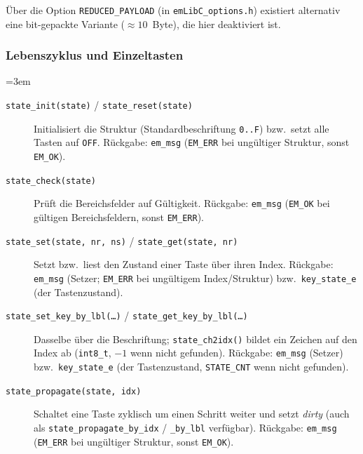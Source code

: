 \noindent Über die Option \verb|REDUCED_PAYLOAD| (in \verb|emLibC_options.h|)
existiert alternativ eine bit-gepackte Variante ($\approx 10$~Byte), die hier
deaktiviert ist.

\subsubsection*{Lebenszyklus und Einzeltasten}
{\sloppy\emergencystretch=3em
\begin{description}
\item[\texttt{state\_init(state)} / \texttt{state\_reset(state)}] Initialisiert
  die Struktur (Standardbeschriftung \verb|0..F|) bzw.\ setzt alle Tasten auf
  \verb|OFF|. Rückgabe: \verb|em_msg| (\verb|EM_ERR| bei ungültiger Struktur,
  sonst \verb|EM_OK|).
\item[\texttt{state\_check(state)}] Prüft die Bereichsfelder auf Gültigkeit.
  Rückgabe: \verb|em_msg| (\verb|EM_OK| bei gültigen Bereichsfeldern, sonst
  \verb|EM_ERR|).
\item[\texttt{state\_set(state, nr, ns)} / \texttt{state\_get(state, nr)}]
  Setzt bzw.\ liest den Zustand einer Taste über ihren Index. Rückgabe:
  \verb|em_msg| (Setzer; \verb|EM_ERR| bei ungültigem Index/Struktur) bzw.\
  \verb|key_state_e| (der Tastenzustand).
\item[\texttt{state\_set\_key\_by\_lbl(\dots)} /
  \texttt{state\_get\_key\_by\_lbl(\dots)}] Dasselbe über die Beschriftung;
  \verb|state_ch2idx()| bildet ein Zeichen auf den Index ab (\verb|int8_t|,
  $-1$ wenn nicht gefunden). Rückgabe: \verb|em_msg| (Setzer) bzw.\
  \verb|key_state_e| (der Tastenzustand, \verb|STATE_CNT| wenn nicht gefunden).
\item[\texttt{state\_propagate(state, idx)}] Schaltet eine Taste zyklisch um
  einen Schritt weiter und setzt \emph{dirty} (auch als
  \verb|state_propagate_by_idx| / \verb|_by_lbl| verfügbar). Rückgabe:
  \verb|em_msg| (\verb|EM_ERR| bei ungültiger Struktur, sonst \verb|EM_OK|).
\end{description}
\par}

